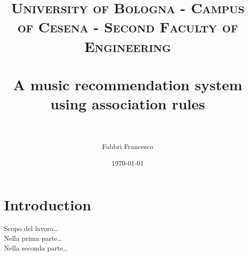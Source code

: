 \documentclass[paper=a4, fontsize=11pt]{scrartcl} %
\title{	
\normalfont \normalsize 
\textsc{University of Bologna - Campus of Cesena - Second Faculty of
Engineering}
\\
[25pt]
\horrule{0.5pt} \\[0.4cm] %
\huge A music recommendation system using association rules
\\
\horrule{2pt} \\[0.5cm] %
}
\author{Fabbri Francesco} %
\date{\normalsize\today} %
\numberwithin{equation}{section} %
\numberwithin{figure}{section} %
\numberwithin{table}{section} %
\begin{document}
\maketitle %


\section{Introduction}
Scopo del lavoro\ldots\\
Nella prima parte\ldots\\
Nella seconda parte\ldots\\
\end{document}
